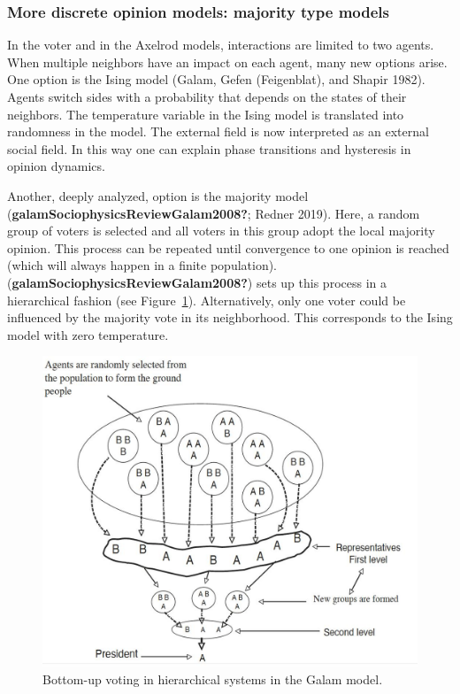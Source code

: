 \documentclass[
  a4paper,
  DIV=11,
  numbers=noendperiod]{scrreprt}
\begin{document}
\hypertarget{sec-More-discrete-opinion-models-majority-type-models}{%
\subsubsection{More discrete opinion models: majority type
models}\label{sec-More-discrete-opinion-models-majority-type-models}}

In the voter and in the Axelrod models, interactions are limited to two
agents. When multiple neighbors have an impact on each agent, many new
options arise. One option is the Ising model (Galam, Gefen (Feigenblat),
and Shapir 1982). Agents switch sides with a probability that depends on
the states of their neighbors. The temperature variable in the Ising
model is translated into randomness in the model. The external field is
now interpreted as an external social field. In this way one can explain
phase transitions and hysteresis in opinion dynamics.

Another, deeply analyzed, option is the majority model
(\textbf{galamSociophysicsReviewGalam2008?}; Redner 2019). Here, a
random group of voters is selected and all voters in this group adopt
the local majority opinion. This process can be repeated until
convergence to one opinion is reached (which will always happen in a
finite population). (\textbf{galamSociophysicsReviewGalam2008?}) sets up
this process in a hierarchical fashion (see
Figure~\ref{fig-ch7-img5-old-93}). Alternatively, only one voter could
be influenced by the majority vote in its neighborhood. This corresponds
to the Ising model with zero temperature.

\begin{figure}

{\centering \includegraphics{media/ch7/image5.jpg}

}

\caption{\label{fig-ch7-img5-old-93}Bottom-up voting in hierarchical
systems in the Galam model.}

\end{figure}
\end{document}
